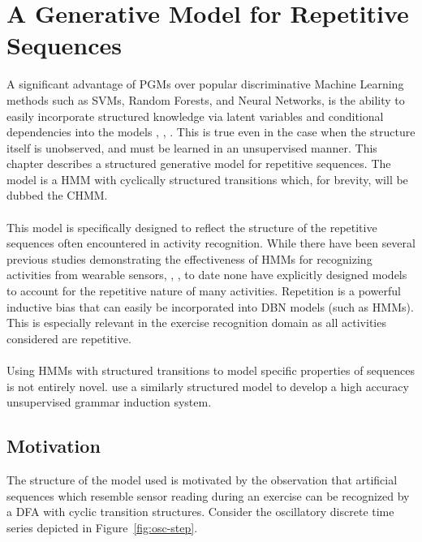 \documentclass[12pt]{report}
\newcommand{\1}[0]{\mathbbm{1}}
\begin{document}
\chapter{A Generative Model for Repetitive Sequences}
\label{chap: A Generative Model for Repetitive Sequences}
A significant advantage of \acp{PGM} over popular discriminative Machine Learning methods
such as \acp{SVM}, Random Forests, and Neural Networks, is the ability to easily incorporate
structured knowledge via latent variables and conditional dependencies into the models
\cite{structured-priors}, \cite{poverty-stimulus}, \cite{how-to-grow-a-mind}.
This is true even in the case when the structure itself is unobserved, and must
be learned in an unsupervised manner. This chapter describes a structured generative model for
repetitive sequences. The model is a \ac{HMM} with cyclically structured transitions which,
for brevity, will be dubbed the \ac{CHMM}.
\\\\
This model is specifically designed to reflect the structure of the repetitive sequences
often encountered in activity recognition. While there have been several previous studies demonstrating
the effectiveness of \acp{HMM} for recognizing activities from wearable sensors, \cite{hhmm-lee},
\cite{factored-hmm-tran}, to date none have explicitly designed models to account for the repetitive nature
of many activities. Repetition is a powerful inductive bias that can easily be incorporated into
\ac{DBN} models (such as \acp{HMM}). This is especially relevant in the exercise recognition
domain as all activities considered are repetitive.
\\\\
Using \ac{HMM}s with structured transitions to model specific properties of sequences is
not entirely novel. \cite{cascaded-finite-state} use a similarly structured model to develop
a high accuracy unsupervised grammar induction system.

\section{Motivation}
The structure of the model used is motivated by the observation that artificial
sequences which resemble sensor reading during an exercise can be recognized by a \ac{DFA}
with cyclic transition structures. Consider the oscillatory discrete time series depicted
in Figure~\ref{fig:osc-step}.
\end{document}
